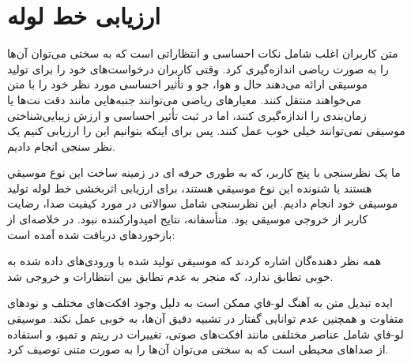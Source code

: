 \section{ارزیابی خط لوله}
متن کاربران اغلب شامل نکات احساسی و انتظاراتی است که به سختی می‌توان آن‌ها را به صورت ریاضی اندازه‌گیری کرد. وقتی کاربران درخواست‌های خود را برای تولید موسیقی ارائه می‌دهند حال و هوا، جو و تأثیر احساسی مورد نظر خود را با متن می‌خواهند منتقل کنند. معیارهای ریاضی می‌توانند جنبه‌هایی مانند دقت نت‌ها یا زمان‌بندی را اندازه‌گیری کنند، اما در ثبت تأثیر احساسی و ارزش زیبایی‌شناختی موسیقی نمی‌توانند خیلی خوب عمل کنند. پس برای اینکه بتوانیم این  را ارزیابی کنیم یک  نظر سنجی انجام دادیم.

ما یک نظرسنجی با پنج کاربر، که به طوری حرفه ای در زمینه ساخت این نوع موسیقي هستند یا شنونده این نوع موسیقي هستند، برای ارزیابی اثربخشی
خط لوله تولید موسیقی خود انجام دادیم. این نظرسنجی شامل سوالاتی در مورد
کیفیت صدا، رضایت کاربر از خروجی موسیقی بود. متأسفانه، نتایج امیدوارکننده
نبود. در  خلاصه‌ای از بازخوردهای دریافت شده آمده است:

\begin{table}
      \centering
      \caption{نتایج نظرسنجی ارزیابی خط لوله}
      \label{tb:result}
\end{table}
همه نظر دهنده‌گان اشاره کردند که موسیقی تولید شده با ورودی‌های داده شده به خوبی
تطابق ندارد، که منجر به عدم تطابق بین انتظارات و خروجی شد.

ایده تبدیل متن به آهنگ ﻟﻮ-ﻓﺎﻱ  ممکن است به دلیل وجود افکت‌های مختلف و نودهای متفاوت و همچنین عدم توانایی گفتار در تشبیه دقیق آن‌ها، به خوبی عمل نکند. موسیقی ﻟﻮ-ﻓﺎﻱ شامل عناصر مختلفی مانند افکت‌های صوتی، تغییرات در ریتم و تمپو، و استفاده از صداهای محیطی است که به سختی می‌توان آن‌ها را به صورت متنی توصیف کرد.


